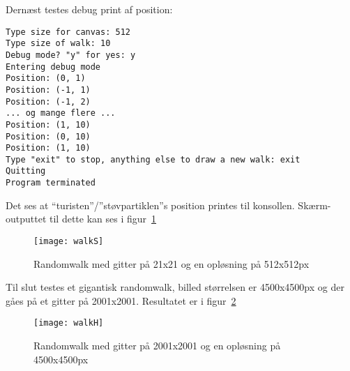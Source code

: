 Dernæst testes debug print af position:
\begin{lstlisting}
Type size for canvas: 512
Type size of walk: 10
Debug mode? "y" for yes: y
Entering debug mode
Position: (0, 1)
Position: (-1, 1)
Position: (-1, 2)
... og mange flere ...
Position: (1, 10)
Position: (0, 10)
Position: (1, 10)
Type "exit" to stop, anything else to draw a new walk: exit
Quitting
Program terminated
\end{lstlisting}
Det ses at ``turisten''/''støvpartiklen''s position printes til konsollen. Skærm-outputtet til dette kan ses i figur~\ref{fig:walkS}

\begin{figure}[h!]
	\centering
	\texttt{[image: walkS]}
		\caption{Randomwalk med gitter på 21x21 og en opløsning på 512x512px}\label{fig:walkS}
\end{figure}

Til slut testes et gigantisk randomwalk, billed størrelsen er 4500x4500px og der gåes på et gitter på 2001x2001. Resultatet er i figur~\ref{fig:walkH}

\begin{figure}[h!]
	\centering
	\texttt{[image: walkH]}
		\caption{Randomwalk med gitter på 2001x2001 og en opløsning på 4500x4500px}\label{fig:walkH}
\end{figure}
